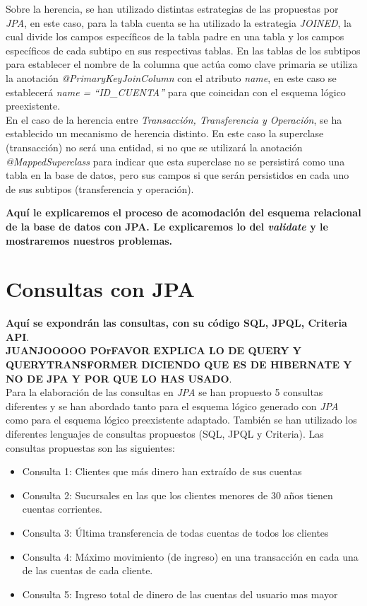 \documentclass[11pt,a4paper]{article}
\begin{document}
Sobre la herencia, se han utilizado distintas estrategias de las propuestas por \emph{JPA}, en este caso, para la tabla cuenta se ha utilizado la estrategia \emph{JOINED}, la cual divide los campos específicos de la tabla padre en una tabla y los campos específicos de cada subtipo en sus respectivas tablas. En las tablas de los subtipos para establecer el nombre de la columna que actúa como clave primaria se utiliza la anotación \emph{@PrimaryKeyJoinColumn} con el atributo \emph{name}, en este caso se establecerá \emph{name = ``ID\_{}CUENTA''} para que coincidan con el esquema lógico preexistente.\\
En el caso de la herencia entre \emph{Transacción, Transferencia y Operación}, se ha establecido un mecanismo de herencia distinto. En este caso la superclase (transacción) no será una entidad, si no que se utilizará la anotación \emph{@MappedSuperclass} para indicar que esta superclase no se persistirá como una tabla en la base de datos, pero sus campos si que serán persistidos en cada uno de sus subtipos (transferencia y operación).

\textbf{Aquí le explicaremos el proceso de acomodación del esquema relacional de la base de datos con JPA. Le explicaremos lo del \emph{validate} y le mostraremos nuestros problemas.}

\section{Consultas con JPA}

\textbf{Aquí se expondrán las consultas, con su código SQL, JPQL, Criteria API}.\\
\textbf{JUANJOOOOO POrFAVOR EXPLICA LO DE QUERY Y QUERYTRANSFORMER DICIENDO QUE ES DE HIBERNATE Y NO DE JPA Y POR QUE LO HAS USADO}.\\
Para la elaboración de las consultas en \emph{JPA} se han propuesto 5 consultas diferentes y se han abordado tanto para el esquema lógico generado con \emph{JPA} como para el esquema lógico preexistente adaptado. También se han utilizado los diferentes lenguajes de consultas propuestos (SQL, JPQL y Criteria). Las consultas propuestas son las siguientes:

\begin{itemize}
\item Consulta 1: Clientes que más dinero han extraído de sus cuentas
\item Consulta 2: Sucursales en las que los clientes menores de 30 años tienen cuentas corrientes.
\item Consulta 3: Última transferencia de todas cuentas de todos los clientes
\item Consulta 4: Máximo movimiento (de ingreso) en una transacción en cada una de las cuentas de cada cliente.
\item Consulta 5: Ingreso total de dinero de las cuentas del usuario mas mayor
\end{itemize}
\end{document}
